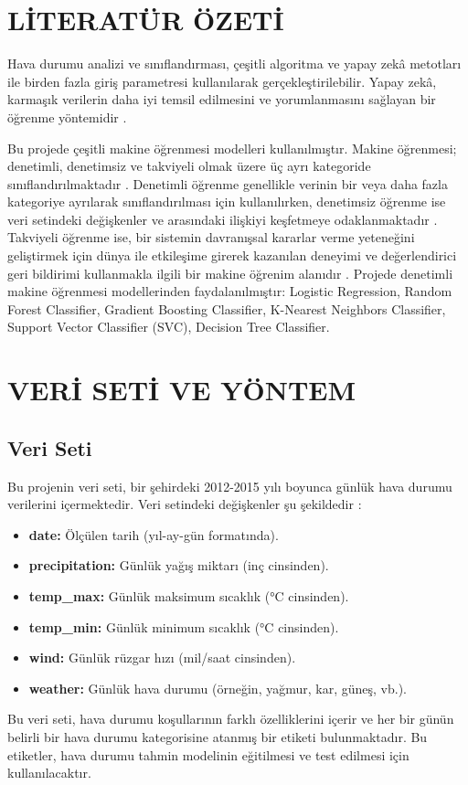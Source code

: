 \documentclass[twocolumn]{article}
\begin{document}
	\section{LİTERATÜR ÖZETİ}
	
	Hava durumu analizi ve sınıflandırması, çeşitli algoritma ve yapay zekâ metotları ile birden fazla giriş parametresi kullanılarak gerçekleştirilebilir. Yapay zekâ, karmaşık verilerin daha iyi temsil edilmesini ve yorumlanmasını sağlayan bir öğrenme yöntemidir \cite{hosny2018artificial}.
	
	Bu projede çeşitli makine öğrenmesi modelleri kullanılmıştır. Makine öğrenmesi; denetimli, denetimsiz ve takviyeli olmak üzere üç ayrı kategoride sınıflandırılmaktadır \cite{greenspan2016guest}. Denetimli öğrenme genellikle verinin bir veya daha fazla kategoriye ayrılarak sınıflandırılması için kullanılırken, denetimsiz öğrenme ise veri setindeki değişkenler ve arasındaki ilişkiyi keşfetmeye odaklanmaktadır \cite{johnson2018artificial}. Takviyeli öğrenme ise, bir sistemin davranışsal kararlar verme yeteneğini geliştirmek için dünya ile etkileşime girerek kazanılan deneyimi ve değerlendirici geri bildirimi kullanmakla ilgili bir makine öğrenim alanıdır \cite{littman2015reinforcement} . Projede denetimli makine öğrenmesi modellerinden faydalanılmıştır: Logistic Regression, Random Forest Classifier, Gradient Boosting Classifier, K-Nearest Neighbors Classifier, Support Vector Classifier (SVC), Decision Tree Classifier. 
	
	\section{VERİ SETİ VE YÖNTEM}
	
	\subsection{Veri Seti}
	Bu projenin veri seti, bir şehirdeki 2012-2015 yılı boyunca günlük hava durumu verilerini içermektedir. Veri setindeki değişkenler şu şekildedir \cite{ananthr1_weather_prediction} :
	\begin{itemize}
		\item \textbf{date:} Ölçülen tarih (yıl-ay-gün formatında).
		\item \textbf{precipitation:} Günlük yağış miktarı (inç cinsinden).
		\item \textbf{temp\_max:} Günlük maksimum sıcaklık (°C cinsinden).
		\item \textbf{temp\_min:} Günlük minimum sıcaklık (°C cinsinden).
		\item \textbf{wind:} Günlük rüzgar hızı (mil/saat cinsinden).
		\item \textbf{weather:} Günlük hava durumu (örneğin, yağmur, kar, güneş, vb.).
	\end{itemize}
	Bu veri seti, hava durumu koşullarının farklı özelliklerini içerir ve her bir günün belirli bir hava durumu kategorisine atanmış bir etiketi bulunmaktadır. Bu etiketler, hava durumu tahmin modelinin eğitilmesi ve test edilmesi için kullanılacaktır.
	
\end{document}
